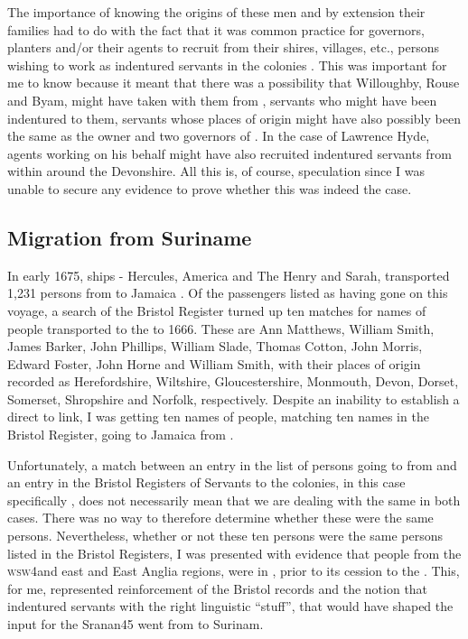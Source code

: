 The importance of knowing the origins of these men and by extension their families had to do with the fact that it was common practice for governors, planters and/or their agents to recruit from their shires, villages, etc., persons wishing to work as indentured servants in the colonies \citep{Bridenbaugh68, Beckles89,  Menard06}. This was important for me to know because it meant that there was a possibility that Willoughby, Rouse and Byam, might have taken with them from , servants who might have been indentured to them, servants whose places of origin might have also possibly been the same as the owner and two governors of . In the case of Lawrence Hyde, agents working on his behalf might have also recruited indentured servants from within around the Devonshire. All this is, of course, speculation since I was unable to secure any evidence to prove whether this was indeed the case.

\subsection{Migration from Suriname}\label{6.2.3}
In early 1675,  ships - Hercules, America and The Henry and Sarah, transported 1,231 persons from  to Jamaica \citep[No. 675 vii; 677i]{Sainsbury93}. Of the passengers listed as having gone on this voyage, a search of the Bristol Register turned up ten matches for names of people transported to the  to 1666. These are Ann Matthews, William Smith, James Barker, John Phillips, William Slade, Thomas Cotton, John Morris, Edward Foster, John Horne and William Smith, with their places of origin recorded as Herefordshire, Wiltshire, Gloucestershire, Monmouth, Devon, Dorset, Somerset, Shropshire and Norfolk, respectively. Despite an inability to establish a direct  to  link, I was getting ten names of people, matching ten names in the Bristol Register, going to Jamaica from .

Unfortunately, a match between an entry in the list of persons going to  from  and an entry in the Bristol Registers of Servants to the  colonies, in this case specifically , does not necessarily mean that we are dealing with the same  in both cases. There was no way to therefore determine whether these were the same persons. Nevertheless, whether or not these ten persons were the same persons listed in the Bristol Registers, I was presented with evidence that people from the \textsc{wsw4}and east and East Anglia regions, were in , prior to its cession to the . This, for me, represented reinforcement of the Bristol records and the notion that indentured servants with the right linguistic ``stuff'', that would have shaped the input for the Sranan45 went from  to Surinam.

